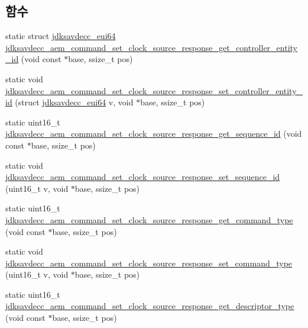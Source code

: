 \subsection*{함수}
\begin{DoxyCompactItemize}
\item 
static struct \hyperlink{structjdksavdecc__eui64}{jdksavdecc\+\_\+eui64} \hyperlink{group__command__set__clock__source__response_ga9e8ac985d57eae444eec61a4c7147ad2}{jdksavdecc\+\_\+aem\+\_\+command\+\_\+set\+\_\+clock\+\_\+source\+\_\+response\+\_\+get\+\_\+controller\+\_\+entity\+\_\+id} (void const $\ast$base, ssize\+\_\+t pos)
\item 
static void \hyperlink{group__command__set__clock__source__response_gad42444658ce497a6388d3e51f54c203b}{jdksavdecc\+\_\+aem\+\_\+command\+\_\+set\+\_\+clock\+\_\+source\+\_\+response\+\_\+set\+\_\+controller\+\_\+entity\+\_\+id} (struct \hyperlink{structjdksavdecc__eui64}{jdksavdecc\+\_\+eui64} v, void $\ast$base, ssize\+\_\+t pos)
\item 
static uint16\+\_\+t \hyperlink{group__command__set__clock__source__response_gad44999922f508c755ce530e491eb668c}{jdksavdecc\+\_\+aem\+\_\+command\+\_\+set\+\_\+clock\+\_\+source\+\_\+response\+\_\+get\+\_\+sequence\+\_\+id} (void const $\ast$base, ssize\+\_\+t pos)
\item 
static void \hyperlink{group__command__set__clock__source__response_gaaee6aa92bf9b0e3663f744764112e163}{jdksavdecc\+\_\+aem\+\_\+command\+\_\+set\+\_\+clock\+\_\+source\+\_\+response\+\_\+set\+\_\+sequence\+\_\+id} (uint16\+\_\+t v, void $\ast$base, ssize\+\_\+t pos)
\item 
static uint16\+\_\+t \hyperlink{group__command__set__clock__source__response_ga528ad2b45a1b0ac8f4f53d414f985f89}{jdksavdecc\+\_\+aem\+\_\+command\+\_\+set\+\_\+clock\+\_\+source\+\_\+response\+\_\+get\+\_\+command\+\_\+type} (void const $\ast$base, ssize\+\_\+t pos)
\item 
static void \hyperlink{group__command__set__clock__source__response_ga805d04a6eaac6d4dad43c8c01425d271}{jdksavdecc\+\_\+aem\+\_\+command\+\_\+set\+\_\+clock\+\_\+source\+\_\+response\+\_\+set\+\_\+command\+\_\+type} (uint16\+\_\+t v, void $\ast$base, ssize\+\_\+t pos)
\item 
static uint16\+\_\+t \hyperlink{group__command__set__clock__source__response_gaf651f455e5ae050ebb45c8b629216ad2}{jdksavdecc\+\_\+aem\+\_\+command\+\_\+set\+\_\+clock\+\_\+source\+\_\+response\+\_\+get\+\_\+descriptor\+\_\+type} (void const $\ast$base, ssize\+\_\+t pos)
\item 

\end{DoxyCompactItemize}
